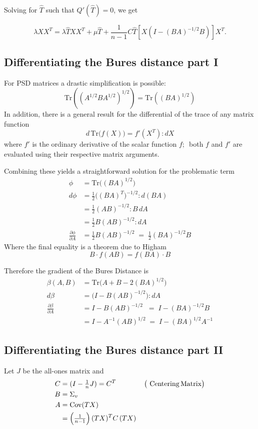 Solving for $\hat{T}$ such that $Q'(\hat{T})=0$, we get

$$
\lambda XX^{T} = \lambda \hat{T} XX^{T} + \mu \hat{T} + \frac{1}{n-1} C\hat{T}[X(I-(BA)^{-1/2}B)]X^{T}.
$$

\subsection*{Differentiating the Bures distance part I}
For PSD matrices a drastic 
simplification is possible:
$$
\textrm {Tr}((A^{1/2}BA^{1/2})^{1/2}) = \textrm{Tr}((BA)^{1/2})
$$
In addition, there is a general result for the differential of the trace of any matrix function
$$
d\,\textrm{Tr}\big(f(X)\big) = f'(X^T):dX
$$
where $f'$ is the ordinary derivative of the scalar function $f;\,$ both $f$ and $f'$ are evaluated using their respective matrix arguments.

Combining these yields a straightforward solution for the problematic term
\begin{align*}
	\phi &= \textrm {Tr}\Big((BA)^{1/2}\Big) \\
	d\phi
	&=  \tfrac 12\big((BA)^T\big)^{-1/2}:d(BA) \\
	&= \tfrac 12(AB)^{-1/2}:B\,dA \\
	&= \tfrac 12 B(AB)^{-1/2}:dA \\
	\frac{\partial\phi}{\partial A}
	&= \tfrac 12 B(AB)^{-1/2} 
	\;=\; \tfrac 12 (BA)^{-1/2}B
\end{align*}
Where the final equality is a theorem due to Higham
$$B\cdot f(AB) = f(BA)\cdot B$$

Therefore the gradient of the Bures Distance is
\begin{align*}
	\beta(A,B) &= \textrm {Tr}\Big(A+B - 2(BA)^{1/2} \Big) \\
	d\beta &= \Big(I - B(AB)^{-1/2}\Big):dA \\
	\frac{\partial\beta}{\partial A}
	&= I - B(AB)^{-1/2} \;\;=\; I - (BA)^{-1/2}B \\
	&= I - A^{-1}(AB)^{1/2} \;=\; I - (BA)^{1/2}A^{-1}
\end{align*}

\subsection*{Differentiating the Bures distance part II}
Let $J$ be the all-ones matrix and 
\begin{align*}
	C &=(I-\tfrac 1nJ) = C^T \qquad\qquad\big(\textrm{ Centering\,Matrix}\big) \\
	B &= \Sigma_v \\
	A &= \textrm{Cov}(TX) \\
	&= \left(\tfrac 1{n-1}\right)(TX)^TC\,(TX)
\end{align*}

